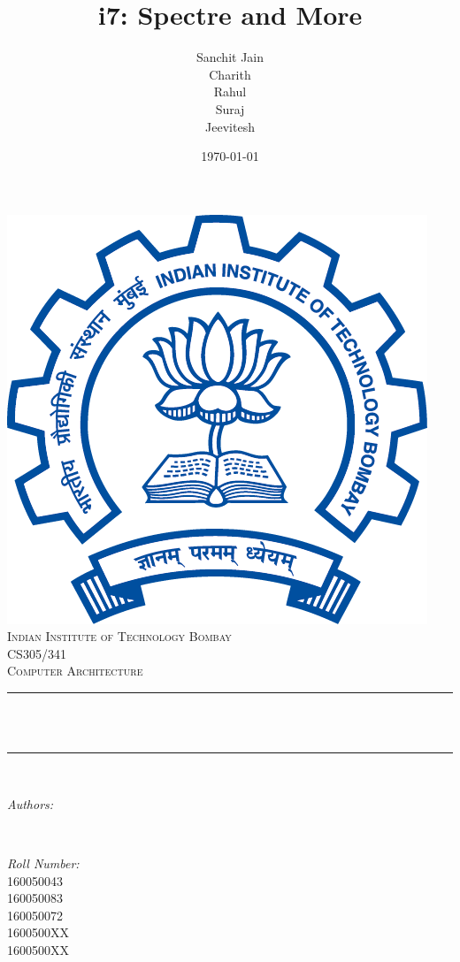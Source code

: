 \documentclass[12pt]{article}
\title{i7: Spectre and More}								%
\author{Sanchit Jain\\ Charith \\Rahul\\Suraj\\ Jeevitesh}								%
\date{\today}											%
\makeatletter
\let\thetitle\@title
\let\theauthor\@author
\let\thedate\@date
\makeatother
\begin{document}

\begin{titlepage}
	\centering
    \vspace*{0.5 cm}
    \includegraphics[scale = 0.25]{logo.png}\\[1.0 cm]	%
    \textsc{\LARGE Indian Institute of Technology Bombay}\\[2.0 cm]	%
	\textsc{\Large CS305/341}\\[0.5 cm]				%
	\textsc{\large  Computer Architecture}\\[0.5 cm]				%
	\rule{\linewidth}{0.2 mm} \\[0.4 cm]
	{ \huge \bfseries \thetitle}\\
	\rule{\linewidth}{0.2 mm} \\[1.5 cm]
	
	\begin{minipage}{0.4\textwidth}
		\begin{flushleft} \large
			\emph{Authors:}\\
			\theauthor
			\end{flushleft}
			\end{minipage}~
			\begin{minipage}{0.4\textwidth}
			\begin{flushright} \large
			\emph{Roll Number:} \\
			160050043\\
			160050083\\
			160050072\\
			1600500XX\\
			1600500XX\\%
		\end{flushright}
	\end{minipage}\\[2 cm]
	
	{\large \thedate}\\[2 cm]
 
	\vfill
	
\end{titlepage}
\end{document}
